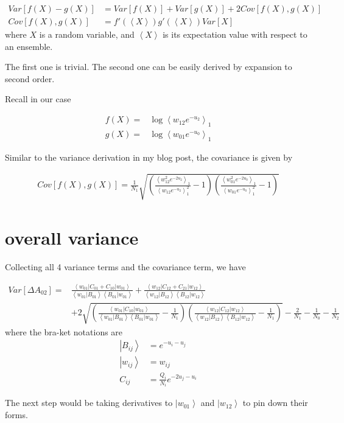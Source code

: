 \documentclass[notitlepage, amsmath, amssymb, aps]{revtex4-1}  %
\begin{document}
\begin{align}
Var[f(X)-g(X)] &= Var[f(X)] + Var[g(X)] + 2Cov[f(X), g(X)] \\
Cov[f(X), g(X)] &= f'(\left<X\right>)g'(\left<X\right>) Var[X]
\end{align}
where $X$ is a random variable, and $\left<X\right>$ is its expectation value with respect to an ensemble.

The first one is trivial. The second one can be easily derived by expansion to second order.

Recall in our case

\begin{align}
f(X) =& \log\left<w_{12} e^{-u_2}\right>_1 \\
g(X) =& \log\left<w_{01}e^{-u_0}\right>_1
\end{align}

Similar to the variance derivation in my blog post, the covariance is given by

\begin{align}
Cov[f(X), g(X)] = \frac{1}{N_1}\sqrt{\left(\frac{\left<w_{12}^2 e^{-2u_2}\right>_1 }{\left<w_{12} e^{-u_2}\right>_1^2 } - 1\right)\left(\frac{\left<w_{01}^2e^{-2u_0}\right>_1}{\left<w_{01}e^{-u_0}\right>_1^2} - 1\right)}
\end{align}


\section{overall variance}

Collecting all 4 variance terms and the covariance term, we have

\begin{align}
Var[\Delta A_{02}] =& \frac{\left<w_{01}|C_{01}+C_{10}|w_{01}\right>}{\left<w_{01}|B_{01}\right>\left<B_{01}|w_{01}\right>}
            + \frac{\left< w_{12}|C_{12} + C_{21} |w_{12} \right>}{\left<w_{12}|B_{12} \right>\left<B_{12}|w_{12} \right>} \\
            &+ 2\sqrt{\left(\frac{\left<w_{01}|C_{10}|w_{01}\right>}{\left<w_{01}|B_{01}\right>\left<B_{01}|w_{01}\right>} -\frac{1}{N_1}\right)
                     \left(\frac{\left< w_{12}|C_{12} |w_{12} \right>}{\left<w_{12}|B_{12} \right>\left<B_{12}|w_{12} \right>} -\frac{1}{N_1}\right)}
            - \frac{2}{N_1} - \frac{1}{N_0} - \frac{1}{N_2}
\end{align}
where the bra-ket notations are
\begin{align}
\left|B_{ij} \right> &= e^{-u_i - u_j} \\
\left|w_{ij} \right> &= w_{ij} \\
C_{ij} &= \frac{Q_i}{N_i} e^{-2u_j - u_i}
\end{align}

The next step would be taking derivatives to $\left|w_{01}\right>$ and $\left|w_{12}\right>$ to pin down their forms.
\end{document}
